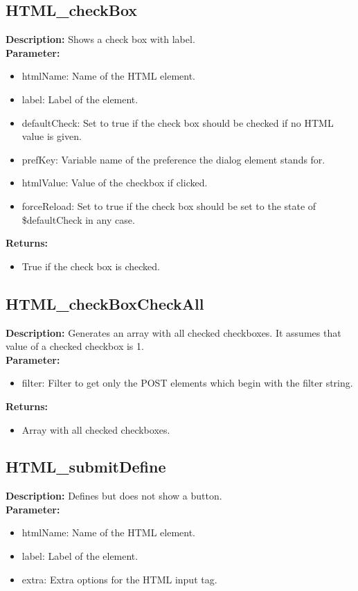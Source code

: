 \subsection{HTML\_checkBox}
\textbf{Description:} Shows a check box with label.\\
\textbf{Parameter:}
\begin{itemize}
\item htmlName: Name of the HTML element.
\item label: Label of the element.
\item defaultCheck: Set to true if the check box should be checked if no HTML value is given.
\item prefKey: Variable name of the preference the dialog element stands for.
\item htmlValue: Value of the checkbox if clicked.
\item forceReload: Set to true if the check box should be set to the state of \$defaultCheck in any case.
\end{itemize}
\textbf{Returns:}
\begin{itemize}
\item True if the check box is checked.
\end{itemize}

\subsection{HTML\_checkBoxCheckAll}
\textbf{Description:} Generates an array with all checked checkboxes. It assumes that value of a checked checkbox is 1.\\
\textbf{Parameter:}
\begin{itemize}
\item filter: Filter to get only the POST elements which begin with the filter string.
\end{itemize}
\textbf{Returns:}
\begin{itemize}
\item Array with all checked checkboxes.
\end{itemize}

\subsection{HTML\_submitDefine}
\textbf{Description:} Defines but does not show a button.\\
\textbf{Parameter:}
\begin{itemize}
\item htmlName: Name of the HTML element.
\item label: Label of the element.
\item extra: Extra options for the HTML input tag.
\end{itemize}

